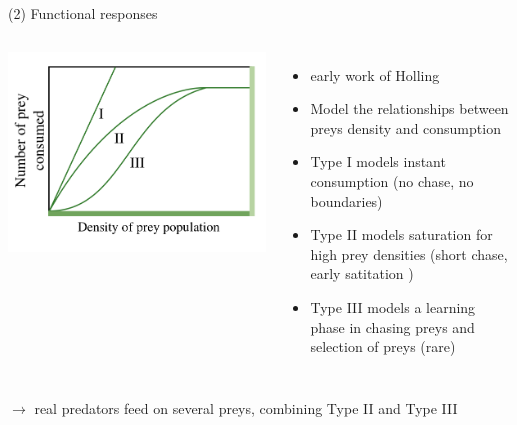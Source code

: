 \documentclass[11,aspectratio=1610]{beamer}
\begin{document}
\begin{frame}{(2) Functional responses}
\begin{scriptsize}

 \begin{columns}
             \centering
             \colorbox{white}{\includegraphics[width=\textwidth]{img/FunctionalResponses.png}}

\begin{itemize}
  \item early work of Holling ~ 
  \item Model the relationships between preys density and consumption 
  \item Type I models instant consumption (no chase, no boundaries) 
  \item Type II models saturation for high prey densities (short chase, early satitation )
  \item Type III models a learning phase in chasing preys  and selection of preys (rare)
\end{itemize}
\end{columns}

\vspace{1cm}

$\rightarrow$ real predators feed on several preys, combining Type II and Type III 
\end{scriptsize}
\end{frame}
\end{document}

